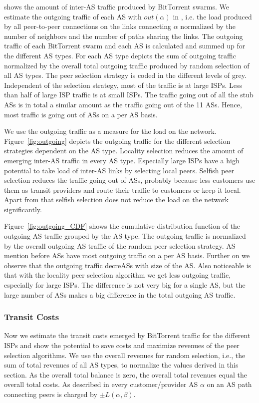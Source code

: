  shows the amount of inter-AS traffic produced by BitTorrent swarms. We estimate the outgoing traffic of each AS with $out(\alpha)$ in , i.e. the load produced by all peer-to-peer connections on the links connecting $\alpha$ normalized by the number of neighbors and the number of paths sharing the links. The outgoing traffic of each BitTorrent swarm and each AS is calculated and summed up for the different AS types. For each AS type  depicts the sum of outgoing traffic normalized by the overall total outgoing traffic produced by random selection of all AS types. The peer selection strategy is coded in the different levels of grey. Independent of the selection strategy, most of the traffic is at large ISPs. Less than half of large ISP traffic is at small ISPs. The traffic going out of all the stub ASs is in total a similar amount as the traffic going out of the 11 \tier ASs. Hence, most traffic is going out of \tier ASs on a per AS basis.

We use the outgoing traffic as a measure for the load on the network.
Figure~\ref{fig:outgoing} depicts the outgoing traffic for the different selection strategies dependent on the AS type. Locality selection reduces the amount of emerging inter-AS traffic in every AS type. Especially large ISPs have a high potential to take load of inter-AS links by selecting local peers. Selfish peer selection reduces the traffic going out of \tier ASs, probably because less customers use them as transit providers and route their traffic to customers or keep it local. Apart from that selfish selection does not reduce the load on the network significantly.

Figure~\ref{fig:outgoing_CDF} shows the cumulative distribution function of the outgoing AS traffic grouped by the AS type. The outgoing traffic is normalized by the overall outgoing AS traffic of the random peer selection strategy. AS mention before \tier ASs have most outgoing traffic on a per AS basis. Further on we observe that the outgoing traffic decreASs with size of the AS. Also noticeable is that with the locality peer selection algorithm we get less outgoing traffic, especially for large ISPs. The difference is not very big for a single AS, but the large number of ASs makes a big difference in the total outgoing AS traffic.

\subsubsection{Transit Costs}
Now we estimate the transit costs emerged by BitTorrent traffic for the different ISPs and show the potential to save costs and maximize revenues of the peer selection algorithms. We use the overall revenues for random selection, i.e., the sum of total revenues of all AS types, to normalize the values derived in this section. As the overall total balance is zero, the overall total revenues equal the overall total costs.
As described in  every customer/provider AS $\alpha$ on an AS path connecting peers is charged by $\pm L(\alpha,\beta)$.

